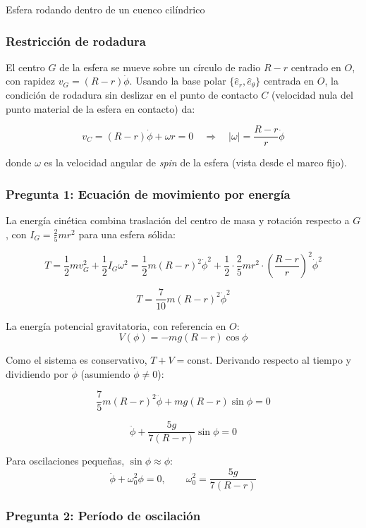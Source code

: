 \begin{solucion}{Esfera rodando dentro de un cuenco cilíndrico}
\subsubsection*{Restricción de rodadura}

El centro $G$ de la esfera se mueve sobre un círculo de radio $R-r$ centrado en $O$, con rapidez $v_G = (R-r)\dot\phi$. Usando la base polar $\{\hat{e}_r,\hat{e}_\theta\}$ centrada en $O$, la condición de rodadura sin deslizar en el punto de contacto $C$ (velocidad nula del punto material de la esfera en contacto) da:

$$v_C = (R-r)\dot\phi + \omega r = 0 \quad\Rightarrow\quad |\omega| = \frac{R-r}{r}\dot\phi$$

donde $\omega$ es la velocidad angular de \emph{spin} de la esfera (vista desde el marco fijo).

\subsubsection*{Pregunta 1: Ecuación de movimiento por energía}

La energía cinética combina traslación del centro de masa y rotación respecto a $G$, con $I_G = \frac{2}{5}mr^2$ para una esfera sólida:

$$T = \frac{1}{2}mv_G^2 + \frac{1}{2}I_G\omega^2 = \frac{1}{2}m(R-r)^2\dot\phi^2 + \frac{1}{2}\cdot\frac{2}{5}mr^2\cdot\left(\frac{R-r}{r}\right)^2\dot\phi^2$$

$$T = \frac{7}{10}m(R-r)^2\dot\phi^2$$

La energía potencial gravitatoria, con referencia en $O$:
$$V(\phi) = -mg(R-r)\cos\phi$$

Como el sistema es conservativo, $T + V = \text{const.}$ Derivando respecto al tiempo y dividiendo por $\dot\phi$ (asumiendo $\dot\phi \neq 0$):

$$\frac{7}{5}m(R-r)^2\ddot\phi + mg(R-r)\sin\phi = 0$$

$$\boxed{\ddot\phi + \frac{5g}{7(R-r)}\sin\phi = 0}$$

Para oscilaciones pequeñas, $\sin\phi \approx \phi$:
$$\ddot\phi + \omega_0^2\phi = 0, \qquad \omega_0^2 = \frac{5g}{7(R-r)}$$

\subsubsection*{Pregunta 2: Período de oscilación}


\end{solucion}
